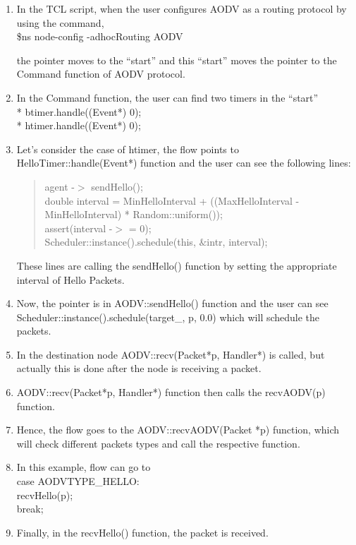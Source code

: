 \documentclass[times,10pt,onecolumn]{article}
\begin{document}
\begin{enumerate}

\item In the TCL script, when the user configures AODV as a routing protocol by using the command,\\
\$ns node-config -adhocRouting AODV

the pointer moves to the ``start'' and this ``start'' moves the pointer to the Command function of AODV protocol.
\item In the Command function, the user can find two timers in the ``start'' \\
    * btimer.handle((Event*) 0);\\
    * htimer.handle((Event*) 0);
\item Let's consider the case of htimer, the flow points to HelloTimer::handle(Event*) function and the user can see the following lines:
   \begin{quote}
 agent -$ >$ sendHello();\\
   double interval = MinHelloInterval +
                 ((MaxHelloInterval - MinHelloInterval) *
Random::uniform());\\
   assert(interval -$>$ = 0);\\
   Scheduler::instance().schedule(this, $\&$intr, interval);
\end{quote}
These lines are calling the sendHello() function by setting the appropriate interval of Hello Packets.
\item Now, the pointer is in AODV::sendHello() function and the user can see Scheduler::instance().schedule(target\_, p, 0.0) which will schedule the packets.
\item In the destination node AODV::recv(Packet*p, Handler*) is called, but actually this is done after the node is receiving a packet.
\item AODV::recv(Packet*p, Handler*) function then calls the recvAODV(p) function.
\item Hence, the flow goes to the AODV::recvAODV(Packet *p) function, which will check different packets types and call the respective function.
\item In this example, flow can go to\\
case AODVTYPE\_HELLO: \\
   recvHello(p);\\
   break;
\item Finally, in the recvHello() function, the packet is received.

\end{enumerate}
\end{document}
